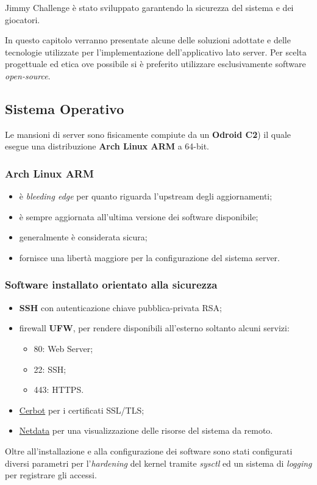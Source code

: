 Jimmy Challenge è stato sviluppato garantendo la sicurezza del sistema e dei giocatori.

In questo capitolo verranno presentate alcune delle soluzioni adottate e delle tecnologie utilizzate per l'implementazione dell'applicativo lato server.
Per scelta progettuale ed etica ove possibile si è preferito utilizzare esclusivamente software \textit{open-source}.

\subsection{Sistema Operativo}
Le mansioni di server sono fisicamente compiute da un \textbf{Odroid C2}) il quale esegue una distribuzione \textbf{Arch Linux ARM} a 64-bit. 

\subsubsection{Arch Linux ARM} 
\begin{itemize}
	\item è \textit{bleeding edge} per quanto riguarda l'upstream degli aggiornamenti;
	\item è sempre aggiornata all'ultima versione dei software disponibile;
	\item generalmente è considerata sicura;
	\item fornisce una libertà maggiore per la configurazione del sistema server.
\end{itemize}

\subsubsection{Software installato orientato alla sicurezza}
\begin{itemize}
	\item \textbf{SSH} con autenticazione chiave pubblica-privata RSA;
	\item firewall \textbf{UFW}, per rendere disponibili all'esterno soltanto alcuni servizi:
	\begin{itemize}
		\item 80: Web Server;
		\item 22: SSH;
		\item 443: HTTPS.
	\end{itemize}
	\item \href{https://certbot.eff.org/}{Cerbot} per i certificati SSL/TLS;
	\item\href{https://github.com/firehol/netdata}{Netdata}  per una visualizzazione delle risorse del sistema da remoto.
\end{itemize}
Oltre all'installazione e alla configurazione dei software sono stati configurati diversi parametri per l'\textit{hardening} del kernel tramite \textit{sysctl} ed un sistema di \textit{logging} per registrare gli accessi.

